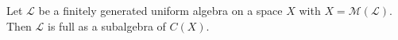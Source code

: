 
Let $\mathcal{L}$ be a finitely generated uniform algebra on a space $X$ with $X = \mathcal{M}(\mathcal{L})$. Then $\mathcal{L}$ is full as a subalgebra of $C(X)$.
